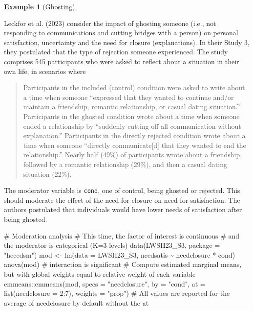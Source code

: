 \documentclass[
  11pt,
  letterpaper,
]{scrbook}
\newenvironment{Shaded}{\begin{snugshade}}{\end{snugshade}}
\newcommand{\AttributeTok}[1]{\textcolor[rgb]{0.40,0.45,0.13}{#1}}
\newcommand{\CommentTok}[1]{\textcolor[rgb]{0.37,0.37,0.37}{#1}}
\newcommand{\DecValTok}[1]{\textcolor[rgb]{0.68,0.00,0.00}{#1}}
\newcommand{\FunctionTok}[1]{\textcolor[rgb]{0.28,0.35,0.67}{#1}}
\newcommand{\NormalTok}[1]{\textcolor[rgb]{0.00,0.23,0.31}{#1}}
\newcommand{\OtherTok}[1]{\textcolor[rgb]{0.00,0.23,0.31}{#1}}
\newcommand{\SpecialCharTok}[1]{\textcolor[rgb]{0.37,0.37,0.37}{#1}}
\newcommand{\StringTok}[1]{\textcolor[rgb]{0.13,0.47,0.30}{#1}}
\theoremstyle{definition}
\theoremstyle{definition}
\newtheorem{example}{Example}[chapter]
\theoremstyle{remark}
\begin{document}
\begin{example}[Ghosting]\protect\hypertarget{exm-moderation2}{}\label{exm-moderation2}

Leckfor et al. (2023) consider the impact of ghosting someone (i.e., not
responding to communications and cutting bridges with a person) on
personal satisfaction, uncertainty and the need for closure
(explanations). In their Study 3, they postulated that the type of
rejection someone experienced. The study comprises 545 participants who
were asked to reflect about a situation in their own life, in scenarios
where

\begin{quote}
Participants in the included (control) condition were asked to write
about a time when someone ``expressed that they wanted to continue
and/or maintain a friendship, romantic relationship, or casual dating
situation.'' Participants in the ghosted condition wrote about a time
when someone ended a relationship by ``suddenly cutting off all
communication without explanation.'' Participants in the directly
rejected condition wrote about a time when someone ``directly
communicate{[}d{]} that they wanted to end the relationship.'' Nearly
half (49\%) of participants wrote about a friendship, followed by a
romantic relationship (29\%), and then a casual dating situation (22\%).
\end{quote}

The moderator variable is \texttt{cond}, one of control, being ghosted
or rejected. This should moderate the effect of the need for closure on
need for satisfaction. The authors postulated that individuals would
have lower needs of satisfaction after being ghosted.

\begin{Shaded}
\begin{Highlighting}[]
\CommentTok{\# Moderation analysis}
\CommentTok{\# This time, the factor of interest is continuous}
\CommentTok{\# and the moderator is categorical (K=3 levels)}
\FunctionTok{data}\NormalTok{(LWSH23\_S3, }\AttributeTok{package =} \StringTok{"hecedsm"}\NormalTok{)}
\NormalTok{mod }\OtherTok{\textless{}{-}} \FunctionTok{lm}\NormalTok{(}\AttributeTok{data =}\NormalTok{ LWSH23\_S3, needsatis }\SpecialCharTok{\textasciitilde{}}\NormalTok{ needclosure }\SpecialCharTok{*}\NormalTok{ cond)}
\FunctionTok{anova}\NormalTok{(mod) }\CommentTok{\# interaction is significant}
\CommentTok{\# Compute estimated marginal means, but with global weights equal to relative weight of each variable}
\NormalTok{emmeans}\SpecialCharTok{::}\FunctionTok{emmeans}\NormalTok{(mod, }\AttributeTok{specs =} \StringTok{"needclosure"}\NormalTok{, }
                 \AttributeTok{by =} \StringTok{"cond"}\NormalTok{, }
                 \AttributeTok{at =} \FunctionTok{list}\NormalTok{(}\AttributeTok{needclosure =} \DecValTok{2}\SpecialCharTok{:}\DecValTok{7}\NormalTok{), }
                 \AttributeTok{weights =} \StringTok{"prop"}\NormalTok{)}
\CommentTok{\# All values are reported for the average of needclosure by default without the at}
\end{Highlighting}
\end{Shaded}


\end{example}
\end{document}
